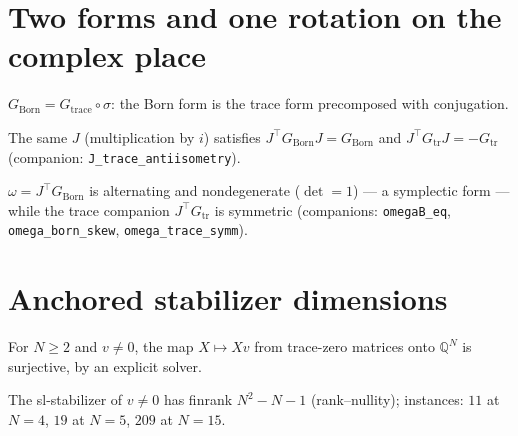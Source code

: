 \chapter{Two forms and one rotation on the complex place}

\begin{theorem}
  \label{thm:dagger_identity}
  \leanok
  $G_{\mathrm{Born}} = G_{\mathrm{trace}} \circ \sigma$: the Born form is the trace form
  precomposed with conjugation.
\end{theorem}

\begin{theorem}
  \label{thm:j_isometries}
  \leanok
  The same $J$ (multiplication by $i$) satisfies $J^{\top} G_{\mathrm{Born}} J = G_{\mathrm{Born}}$
  and $J^{\top} G_{\mathrm{tr}} J = -G_{\mathrm{tr}}$ (companion: \texttt{J\_trace\_antiisometry}).
\end{theorem}

\begin{theorem}
  \label{thm:omega_symplectic}
  \leanok
  $\omega = J^{\top} G_{\mathrm{Born}}$ is alternating and nondegenerate ($\det = 1$) — a symplectic
  form — while the trace companion $J^{\top} G_{\mathrm{tr}}$ is symmetric (companions:
  \texttt{omegaB\_eq}, \texttt{omega\_born\_skew}, \texttt{omega\_trace\_symm}).
\end{theorem}

\chapter{Anchored stabilizer dimensions}

\begin{theorem}
  \label{thm:slaction_surj}
  \leanok
  For $N \ge 2$ and $v \ne 0$, the map $X \mapsto Xv$ from trace-zero matrices onto
  $\mathbb{Q}^N$ is surjective, by an explicit solver.
\end{theorem}

\begin{theorem}
  \label{thm:finrank_stab}
  \leanok
  The sl-stabilizer of $v \ne 0$ has finrank $N^2-N-1$ (rank–nullity); instances:
  $11$ at $N{=}4$, $19$ at $N{=}5$, $209$ at $N{=}15$.
\end{theorem}

